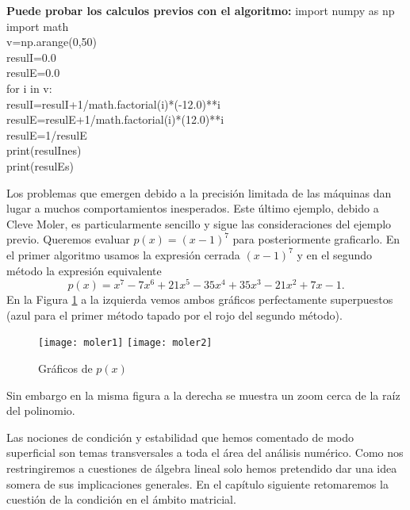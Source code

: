 \begin{tcolorbox}{\bf Puede probar los calculos previos con el algoritmo:}
import numpy as np\\
import math     \\
v=np.arange(0,50)\\
resulI=0.0 \\
resulE=0.0 \\
for i in v:\\

\qquad resulI=resulI+1/math.factorial(i)*(-12.0)**i\\

\qquad resulE=resulE+1/math.factorial(i)*(12.0)**i   \\
resulE=1/resulE \\
print(resulInes)\\
print(resulEs)
\end{tcolorbox}
Los problemas que emergen debido a la precisión limitada de las máquinas dan lugar a muchos comportamientos inesperados. Este último ejemplo, debido a Cleve Moler, es particularmente sencillo y sigue las consideraciones del ejemplo previo. Queremos evaluar $p(x)=(x-1)^7$ para posteriormente graficarlo.
En el primer algoritmo usamos la expresión cerrada $(x-1)^7$  y en el segundo método la expresión equivalente
$$
p(x)=x^7-7x^6+21x^5-35x^4+35x^3-21x^2+7x-1.
$$
En la Figura \ref{fig:moler} a la izquierda vemos ambos gráficos perfectamente superpuestos (azul para el primer método tapado por el rojo del segundo método).
\begin{figure}
 \texttt{[image: moler1]}
 \texttt{[image: moler2]}
 \caption{Gráficos de $p(x)$}
 \label{fig:moler}
 \end{figure}
Sin embargo en la misma figura a la derecha se muestra un zoom cerca de la raíz del polinomio.



Las nociones de condición y estabilidad que hemos comentado de modo superficial son temas transversales a toda el área del análisis  numérico. Como nos restringiremos a cuestiones de álgebra lineal solo hemos pretendido dar una idea somera de sus implicaciones generales. En el capítulo siguiente retomaremos la cuestión de la condición en el ámbito matricial.

